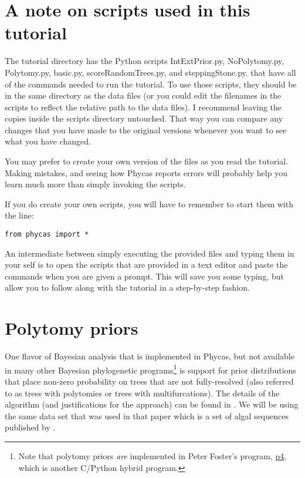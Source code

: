 \documentclass{article}
\newcommand{\phycas}{Phycas\xspace}
\newcommand{\localfile}[1]{\textsf{#1}\xspace}
\begin{document}
\section{A note on scripts used in this tutorial}
The tutorial directory has the Python
scripts \localfile{IntExtPrior.py}, \localfile{NoPolytomy.py},
\localfile{Polytomy.py}, \localfile{basic.py}, \localfile{scoreRandomTrees.py}, and  \localfile{steppingStone.py}.
that have all of the commands needed to run the tutorial.
To use those scripts, they should be in the same directory
as the data files (or you could edit the
filenames in the scripts to reflect the relative 
path to the data files).
I recommend leaving the copies inside the \localfile{scripts} directory 
untouched.
That way you can compare any changes that you have made
to the original versions whenever you want to see what 
you have changed.

You may prefer to create your own version of the
files as you read the tutorial.
Making mistakes, and seeing how \phycas reports
errors will probably help you learn much more 
than simply invoking the scripts.

If you do create your own scripts, you will have to remember
to start them with the line:
\begin{verbatim}
from phycas import *
\end{verbatim}

An intermediate between simply executing the provided files
and typing them in your self is to open the scripts that are provided in
a text editor and paste the commands when you are given 
a prompt.
This will save you some typing, but allow you to follow 
along with the tutorial in a step-by-step fashion.

\section{Polytomy priors}

One flavor of Bayesian analysis that is implemented in \phycas, but not available in many other Bayesian phylogenetic programs\footnote{Note that polytomy priors {\em are} implemented in Peter Foster's program, \href{http://bmnh.org/~pf/p4.html}{p4}, which is another C/Python hybrid program.} is support for prior distributions that place non-zero probability on trees that are not fully-resolved (also referred to as trees with polytomies or trees with multifurcations).
The details of the algorithm (and justifications for the approach) can be found in \citet{LewisHolderHolsinger2005}.
We will be using the same data set that was used in that paper which is a set of algal sequences published by \citet{ShoupL2003}.
\end{document}
